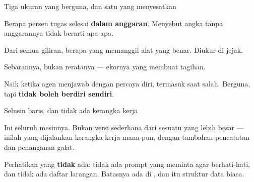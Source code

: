 \documentclass[aspectratio=169,11pt,t]{beamer}
\begin{document}
\begin{frame}[shrink=25]{Tiga ukuran yang berguna, dan satu yang menyesatkan}
\begin{minipage}[t]{0.494\textwidth}
\begin{icardgood}
Berapa persen tugas selesai \textbf{dalam anggaran}. Menyebut angka tanpa anggarannya tidak berarti apa-apa.
\end{icardgood}
\end{minipage}%
\hfill
\begin{minipage}[t]{0.494\textwidth}
\begin{icardgood}
Dari semua giliran, berapa yang memanggil alat yang benar. Diukur di jejak.
\end{icardgood}
\end{minipage}%


\vskip 4pt

\begin{minipage}[t]{0.494\textwidth}
\begin{icardgood}
Sebarannya, bukan reratanya --- ekornya yang membuat tagihan.
\end{icardgood}
\end{minipage}%
\hfill
\begin{minipage}[t]{0.494\textwidth}
\begin{icardbad}
Naik ketika agen menjawab dengan percaya diri, termasuk saat salah. Berguna, tapi \textbf{tidak boleh berdiri sendiri}.
\end{icardbad}
\end{minipage}%
\end{frame}


\begin{frame}[shrink=25]{Selusin baris, dan tidak ada kerangka kerja}
{\fontsize{9.4}{12.6}\selectfont\color{fg2}Ini seluruh mesinnya. Bukan versi sederhana dari sesuatu yang lebih besar --- inilah yang dijalankan kerangka kerja mana pun, dengan tambahan pencatatan dan penanganan galat.\par}\vskip 4pt
{\fontsize{9.4}{12.6}\selectfont\color{fg2}Perhatikan yang \textbf{tidak} ada: tidak ada prompt yang meminta agar berhati-hati, dan tidak ada daftar larangan. Batasnya ada di , dan itu struktur data biasa.\par}\vskip 4pt
\end{frame}
\end{document}
